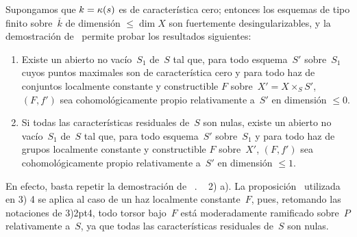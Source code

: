 
\begin{subremarque}
\label{XIII.3.1.3}
Supongamos
que $k=\kappa(s)$ es de característica cero; entonces los esquemas de
tipo finito sobre~$\overline{k}$ de dimensión $\leqslant\dim X$ son
fuertemente desingularizables, y la demostración de~
permite probar los resultados siguientes:
\begin{enumerate}
\item[a)] Existe un abierto no vacío~$S_1$ de~$S$ tal que, para todo
esquema~$S'$ sobre~$S_1$ cuyos puntos maximales son de característica
cero y para todo haz de conjuntos localmente constante y constructible
$F$ sobre~$X'=X\times_SS'$, $(F,f')$ sea cohomológicamente propio
relativamente a~$S'$ en dimensión $\leqslant 0$.

\item[b)] Si todas las características residuales de~$S$ son nulas,
existe un abierto no vacío~$S_1$ de~$S$ tal que, para todo esquema~$S'$
sobre~$S_1$ y para todo haz de grupos localmente constante y constructible
$F$ sobre~$X'$, $(F,f')$ sea cohomológicamente propio relativamente
a~$S'$ en dimensión $\leqslant 1$.
\end{enumerate}

En efecto, basta repetir la demostración de~
{.}
{~}%
2)\kern2pt a). La proposición~ utilizada en 3)\kern2pt 4
se aplica al caso de un haz localmente constante~$F$, pues, retomando las
notaciones de 3)\kern2pt4, todo torsor bajo~$F$ está moderadamente
ramificado sobre~$P$ relativamente a~$S$, ya que todas las características
residuales de~$S$ son nulas.
\end{subremarque}
